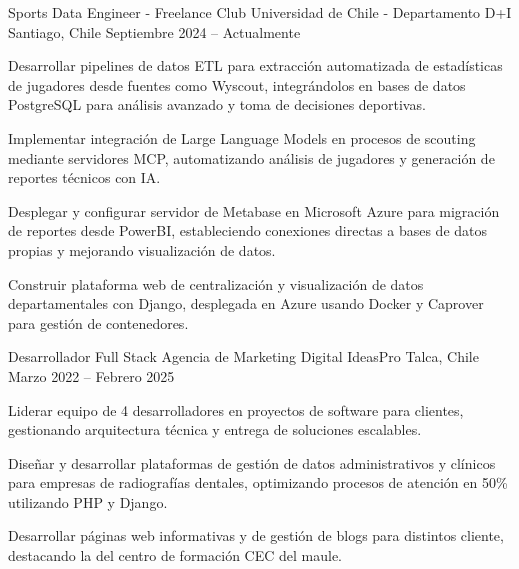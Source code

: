 \documentclass[]{awesome-cv}
\begin{document}
\begin{cventries}
	\cventry
	{Sports Data Engineer - Freelance}
	{Club Universidad de Chile - Departamento D+I}
	{Santiago, Chile}
	{Septiembre 2024 – Actualmente}
	{\begin{cvitems}
		\vspace{0.5mm}
		\item {Desarrollar pipelines de datos ETL para extracción automatizada de estadísticas de jugadores desde fuentes como Wyscout, integrándolos en bases de datos PostgreSQL para análisis avanzado y toma de decisiones deportivas.}
		\item {Implementar integración de Large Language Models en procesos de scouting mediante servidores MCP, automatizando análisis de jugadores y generación de reportes técnicos con IA.}
		\item {Desplegar y configurar servidor de Metabase en Microsoft Azure para migración de reportes desde PowerBI, estableciendo conexiones directas a bases de datos propias y mejorando visualización de datos.}
		\item {Construir plataforma web de centralización y visualización de datos departamentales con Django, desplegada en Azure usando Docker y Caprover para gestión de contenedores.}
		\end{cvitems}}

	\cventry
	{Desarrollador Full Stack}
	{Agencia de Marketing Digital IdeasPro}
	{Talca, Chile}
	{Marzo 2022 – Febrero 2025}
	{\begin{cvitems}
		\vspace{0.5mm}
		\item {Liderar equipo de 4 desarrolladores en proyectos de software para clientes, gestionando arquitectura técnica y entrega de soluciones escalables.}
		\item {Diseñar y desarrollar plataformas de gestión de datos administrativos y clínicos para empresas de radiografías dentales, optimizando procesos de atención en 50\% utilizando PHP y Django.}
		\item {Desarrollar páginas web informativas y de gestión de blogs para distintos cliente, destacando la del centro de formación CEC del maule.}
		\end{cvitems}}

\end{cventries}
\end{document}
